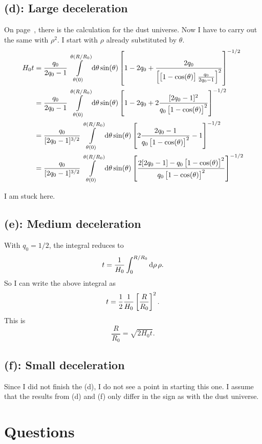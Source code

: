 \subsection*{(d): Large deceleration}

On page~\pageref{sec:P12-d}, there is the calculation for the dust universe.
Now I have to carry out the same with $\rho^2$. I start with $\rho$ already
substituted by $\theta$.
\begin{align*}
    H_0 t
    &= \frac{q_0}{2q_0 - 1} \intop_{\theta(0)}^{\theta(R/R_0)} \dif \theta
    \sin(\theta) \sbr{1-2q_0 + \frac{2q_0}{\sbr{\sbr{1 - \cos(\theta)}
    \frac{q_0}{2q_0 - 1}}^2}}^{-1/2} \\
    &= \frac{q_0}{2q_0 - 1} \intop_{\theta(0)}^{\theta(R/R_0)} \dif \theta
    \sin(\theta) \sbr{1-2q_0 + 2 \frac{[2q_0 - 1]^2}{q_0 \sbr{1 -
    \cos(\theta)}^2}}^{-1/2} \\
    &= \frac{q_0}{[2q_0 - 1]^{3/2}} \intop_{\theta(0)}^{\theta(R/R_0)} \dif \theta
    \sin(\theta) \sbr{2 \frac{2q_0 - 1}{q_0 \sbr{1 -
    \cos(\theta)}^2} - 1}^{-1/2} \\
    &= \frac{q_0}{[2q_0 - 1]^{3/2}} \intop_{\theta(0)}^{\theta(R/R_0)} \dif \theta
    \sin(\theta) \sbr{\frac{2[2q_0 - 1] - q_0\sbr{1 -
    \cos(\theta)}^2}{q_0 \sbr{1 -
    \cos(\theta)}^2}}^{-1/2}
\end{align*}

I am stuck here.

\subsection*{(e): Medium deceleration}

With $q_0 = 1/2$, the integral reduces to
\[
    t = \frac{1}{H_0} \int_0^{R/R_0} \dif \rho \, \rho.
\]
So I can write the above integral as
\[
    t = \frac12 \frac{1}{H_0} \sbr{\frac{R}{R_0}}^{2}.
\]
This is
\[
    \frac{R}{R_0} = \sqrt{2 H_0t}.
\]

\subsection*{(f): Small deceleration}

Since I did not finish the (d), I do not see a point in starting this one. I
assume that the results from (d) and (f) only differ in the sign as with the
dust universe.

\newpage
\section*{Questions}

